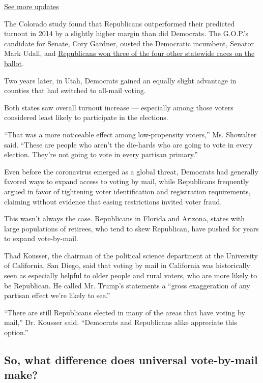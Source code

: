 \href{https://www.nytimes.com/2020/07/31/us/elections/biden-vs-trump.html?action=click\&pgtype=Article\&state=default\&region=MAIN_CONTENT_1\&context=storylines_live_updates}{See
more updates}

The Colorado study found that Republicans outperformed their predicted
turnout in 2014 by a slightly higher margin than did Democrats. The
G.O.P.'s candidate for Senate, Cory Gardner, ousted the Democratic
incumbent, Senator Mark Udall, and
\href{https://www.nytimes.com/elections/2014/colorado-elections}{Republicans
won three of the four other statewide races on the ballot}.

Two years later, in Utah, Democrats gained an equally slight advantage
in counties that had switched to all-mail voting.

Both states saw overall turnout increase --- especially among those
voters considered least likely to participate in the elections.

``That was a more noticeable effect among low-propensity voters,'' Ms.
Showalter said. ``These are people who aren't the die-hards who are
going to vote in every election. They're not going to vote in every
partisan primary.''

Even before the coronavirus emerged as a global threat, Democrats had
generally favored ways to expand access to voting by mail, while
Republicans frequently argued in favor of tightening voter
identification and registration requirements, claiming without evidence
that easing restrictions invited voter fraud.

This wasn't always the case. Republicans in Florida and Arizona, states
with large populations of retirees, who tend to skew Republican, have
pushed for years to expand vote-by-mail.

Thad Kousser, the chairman of the political science department at the
University of California, San Diego, said that voting by mail in
California was historically seen as especially helpful to older people
and rural voters, who are more likely to be Republican. He called Mr.
Trump's statements a ``gross exaggeration of any partisan effect we're
likely to see.''

``There are still Republicans elected in many of the areas that have
voting by mail,'' Dr. Kousser said. ``Democrats and Republicans alike
appreciate this option.''

\hypertarget{so-what-difference-does-universal-vote-by-mail-make}{%
\subsection{So, what difference does universal vote-by-mail
make?}\label{so-what-difference-does-universal-vote-by-mail-make}}


